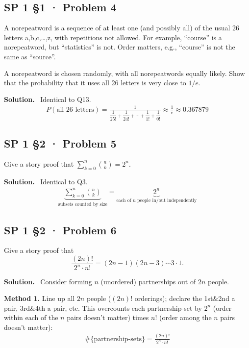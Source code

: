 \documentclass[11pt]{article}
\newcommand{\Sol}{\vspace{2pt}\noindent\textbf{Solution.}\ }
\begin{document}
\subsection{SP 1 §1 · Problem 4}
\begin{qbox}
A norepeatword is a sequence of at least one (and possibly all) of the usual 26 letters a,b,c,\dots,z, with repetitions not allowed. For example, ``course'' is a norepeatword, but ``statistics'' is not. Order matters, e.g., ``course'' is not the same as ``source''.

A norepeatword is chosen randomly, with all norepeatwords equally likely. Show that the probability that it uses all 26 letters is very close to $1/e$.
\end{qbox}
\Sol
Identical to Q13.
\begin{align*}
P(\text{all 26 letters}) = \frac{1}{\dfrac{1}{25!}+\dfrac{1}{24!}+\cdots+\dfrac{1}{1!}+\dfrac{1}{0!}} \approx \frac{1}{e} \approx 0.367879
\end{align*}

\subsection{SP 1 §2 · Problem 5}
\begin{qbox}
Give a story proof that $\displaystyle\sum_{k=0}^n \binom{n}{k}=2^n$.
\end{qbox}
\Sol
Identical to Q3.
\begin{align*}
\underbrace{\sum_{k=0}^n \binom{n}{k}}_{\text{subsets counted by size}} = \underbrace{2^n}_{\text{each of $n$ people in/out independently}}
\end{align*}

\subsection{SP 1 §2 · Problem 6}
\begin{qbox}
Give a story proof that
\[
\frac{(2n)!}{2^n \cdot n!} = (2n-1)(2n-3)\cdots 3\cdot 1.
\]
\end{qbox}
\Sol
Consider forming $n$ (unordered) partnerships out of $2n$ people.

\textbf{Method 1.} Line up all $2n$ people ($(2n)!$ orderings); declare the 1st\&2nd a pair, 3rd\&4th a pair, etc. This overcounts each partnership-set by $2^n$ (order within each of the $n$ pairs doesn't matter) times $n!$ (order among the $n$ pairs doesn't matter):
\begin{align*}
\#\{\text{partnership-sets}\} = \frac{(2n)!}{2^n\cdot n!}
\end{align*}
\end{document}
